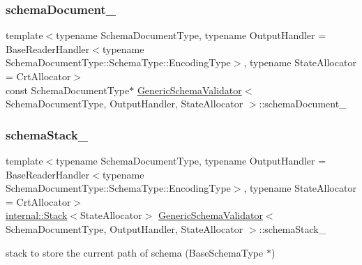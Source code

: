 \mbox{\label{classGenericSchemaValidator_a433e6fe22bea392d1dbd57e9f581bd7a}} 
\subsubsection{\texorpdfstring{schema\+Document\+\_\+}{schemaDocument\_}}
{\footnotesize\ttfamily template$<$typename Schema\+Document\+Type, typename Output\+Handler = Base\+Reader\+Handler$<$typename Schema\+Document\+Type\+::\+Schema\+Type\+::\+Encoding\+Type$>$, typename State\+Allocator = Crt\+Allocator$>$ \\
const Schema\+Document\+Type$\ast$ \hyperlink{classGenericSchemaValidator}{Generic\+Schema\+Validator}$<$ Schema\+Document\+Type, Output\+Handler, State\+Allocator $>$\+::schema\+Document\+\_\+\hspace{0.3cm}{\ttfamily [private]}}

\mbox{\label{classGenericSchemaValidator_ae5775fdd9f94b8a2581f774d97135670}} 
\subsubsection{\texorpdfstring{schema\+Stack\+\_\+}{schemaStack\_}}
{\footnotesize\ttfamily template$<$typename Schema\+Document\+Type, typename Output\+Handler = Base\+Reader\+Handler$<$typename Schema\+Document\+Type\+::\+Schema\+Type\+::\+Encoding\+Type$>$, typename State\+Allocator = Crt\+Allocator$>$ \\
\hyperlink{classinternal_1_1Stack}{internal\+::\+Stack}$<$State\+Allocator$>$ \hyperlink{classGenericSchemaValidator}{Generic\+Schema\+Validator}$<$ Schema\+Document\+Type, Output\+Handler, State\+Allocator $>$\+::schema\+Stack\+\_\+\hspace{0.3cm}{\ttfamily [private]}}



stack to store the current path of schema (Base\+Schema\+Type $\ast$) 

\mbox{\label{classGenericSchemaValidator_a1fea37905619d085cb3d3c6699b209a5}} 
